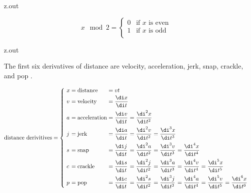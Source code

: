 \MyIO


\begin{VerbatimOut}{z.out}

\begin{equation}
  x \mod 2 =
  \begin{cases}
    0& \text{if $x$ is even}\\
    1& \text{if $x$ is odd}\\
  \end{cases}
\end{equation}
\end{VerbatimOut}

\MyIO


\begin{VerbatimOut}{z.out}

The first six derivatives of distance are velocity, acceleration, jerk, snap, crackle,
and pop
\cite{reid2013}.

\begin{equation}
  \AtBeginEnvironment{array}{\everymath{\displaystyle}}
  \arraycolsep = 0pt
  \text{distance derivitives} = \left\{\ %
    \begin{array}{llllllll}
      x&      {}=\text{distance}&     {}=vt\\[2pt]
      v&      {}=\text{velocity}&     {}=\frac{\di x}{\di t}\\[9pt]
      a&      {}=\text{acceleration}& {}=\frac{\di v}{\di t}& {}=\frac{\di^2x}{\di t^2}\\[9pt]
      \mit j& {}=\text{jerk}&         {}=\frac{\di a}{\di t}& {}=\frac{\di^2v}{\di t^2}&
        {}=\frac{\di^3x}{\di t^3}\\[9pt]
      s
        & {}=\text{snap}
        & {}=\frac{\di \mit j}{\di t}
        & {}=\frac{\di^2a}{\di t^2}
        & {}=\frac{\di^3v}{\di t^3}
        & {}=\frac{\di^4x}{\di t^4}\\[9pt]
      c
        & {}=\text{crackle}
        & {}=\frac{\di s}{\di t}
        & {}=\frac{\di^2\mit j}{\di t^2}
        & {}=\frac{\di^3a}{\di t^3}
        & {}=\frac{\di^4v}{\di t^4}
        & {}=\frac{\di^5x}{\di t^5}\\[9pt]
      p
        & {}=\text{pop}
        & {}=\frac{\di c}{\di t}
        & {}=\frac{\di^2s}{\di t^2}
        & {}=\frac{\di^3\mit j}{\di t^3}
        & {}=\frac{\di^4a}{\di t^4}
        & {}=\frac{\di^5v}{\di t^5}
        & {}=\frac{\di^6x}{\di t^6}
    \end{array}
  \right.
\end{equation}
\end{VerbatimOut}


